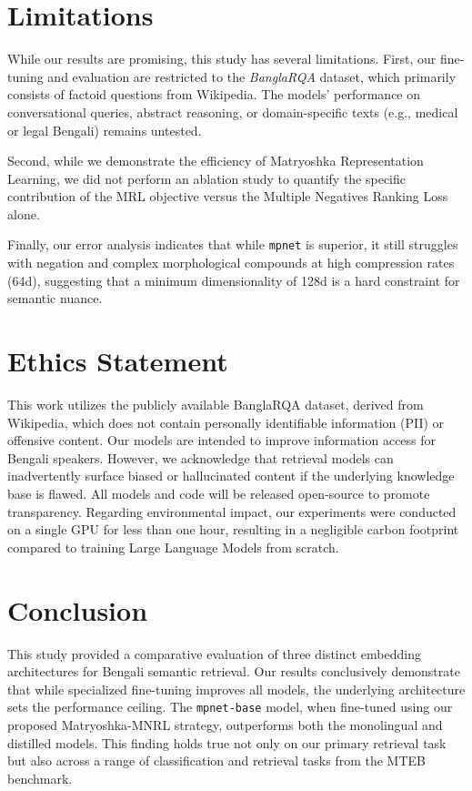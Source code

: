 \documentclass[manuscript,screen,review]{acmart}
\begin{document}
\section{Limitations}

While our results are promising, this study has several limitations. First, our fine-tuning and evaluation are restricted to the \textit{BanglaRQA} dataset, which primarily consists of factoid questions from Wikipedia. The models' performance on conversational queries, abstract reasoning, or domain-specific texts (e.g., medical or legal Bengali) remains untested. 

Second, while we demonstrate the efficiency of Matryoshka Representation Learning, we did not perform an ablation study to quantify the specific contribution of the MRL objective versus the Multiple Negatives Ranking Loss alone. 

Finally, our error analysis indicates that while \texttt{mpnet} is superior, it still struggles with negation and complex morphological compounds at high compression rates (64d), suggesting that a minimum dimensionality of 128d is a hard constraint for semantic nuance.


\section{Ethics Statement}

This work utilizes the publicly available BanglaRQA dataset, derived from Wikipedia, which does not contain personally identifiable information (PII) or offensive content. Our models are intended to improve information access for Bengali speakers. However, we acknowledge that retrieval models can inadvertently surface biased or hallucinated content if the underlying knowledge base is flawed. All models and code will be released open-source to promote transparency. Regarding environmental impact, our experiments were conducted on a single GPU for less than one hour, resulting in a negligible carbon footprint compared to training Large Language Models from scratch.

\section{Conclusion}

This study provided a comparative evaluation of three distinct embedding architectures for Bengali semantic retrieval. Our results conclusively demonstrate that while specialized fine-tuning improves all models, the underlying architecture sets the performance ceiling. The \texttt{mpnet-base} model, when fine-tuned using our proposed Matryoshka-MNRL strategy, outperforms both the monolingual and distilled models. This finding holds true not only on our primary retrieval task but also across a range of classification and retrieval tasks from the MTEB benchmark.
\end{document}
